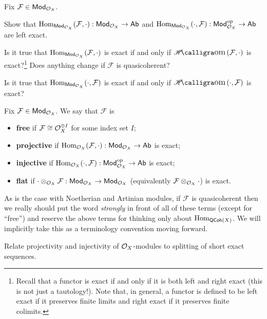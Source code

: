 \documentclass[11pt]{article}
\renewcommand{\F}{\mathcal{F}}
\begin{document}
\begin{exercise}
Fix $\F\in\Mod_{\O_X}$.
\begin{enum}{\alph}
\item Show that $\Hom_{\Mod_{\O_X}}(\F,\cdot): \Mod_{\O_X}\to\Ab$ and $\Hom_{\Mod_{\O_X}}(\cdot,\F): \Mod_{\O_X}^{\op}\to\Ab$ are left exact.

\item Is it true that $\Hom_{\Mod_{\O_X}}(\F,\cdot)$ is exact if and only if $\HHom(\F,\cdot)$ is exact?\footnote{Recall that a functor is exact if and only if it is both left and right exact (this is not just a tautology!). Note that, in general, a functor is defined to be left exact if it preserves finite limits and right exact if it preserves finite colimits.} Does anything change if $\F$ is quasicoherent?

\item Is it true that $\Hom_{\Mod_{\O_X}}(\cdot,\F)$ is exact if and only if $\HHom(\cdot,\F)$ is exact?
\end{enum}
\end{exercise}

\begin{definition}
Fix $\F\in\Mod_{\O_X}$. We say that $\F$ is
\begin{itemize}
\item \textbf{free} if $\F\iso\O_X^{\oplus I}$ for some index set $I$;

\item \textbf{projective} if $\Hom_{\O_X}(\F,\cdot): \Mod_{\O_X}\to\Ab$ is exact;

\item \textbf{injective} if $\Hom_{\O_X}(\cdot,\F): \Mod_{\O_X}^{\op}\to\Ab$ is exact;

\item \textbf{flat} if $\cdot\tensor_{\O_X}\F: \Mod_{\O_X}\to\Mod_{\O_X}$ (equivalently $\F\tensor_{\O_X}\cdot$) is exact.
\end{itemize}
\end{definition}

As is the case with Noetherian and Artinian modules, if $\F$ is quasicoherent then we really should put the word \emph{strongly} in front of all of these terms (except for ``free'') and reserve the above terms for thinking only about $\operatorname{Hom}_{\operatorname{\mathsf{QCoh}}(X)}$. We will implicitly take this as a terminology convention moving forward.

\begin{exercise}
Relate projectivity and injectivity of $\mathcal{O}_X$-modules to splitting of short exact sequences.
\end{exercise}
\end{document}
